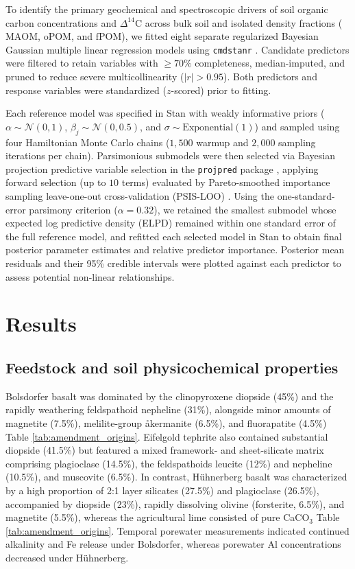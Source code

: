 \documentclass[preprint,12pt]{elsarticle}
\begin{document}
To identify the primary geochemical and spectroscopic drivers of soil organic carbon concentrations and $\Delta^{14}\text{C}$ across bulk soil and isolated density fractions ($\text{MAOM}$, $\text{oPOM}$, and $\text{fPOM}$), we fitted eight separate regularized Bayesian Gaussian multiple linear regression models using \texttt{cmdstanr} \citep{Carpenter2017, Gabry2025}. Candidate predictors were filtered to retain variables with $\ge 70\%$ completeness, median-imputed, and pruned to reduce severe multicollinearity ($|r| > 0.95$). Both predictors and response variables were standardized ($z$-scored) prior to fitting.

Each reference model was specified in Stan with weakly informative priors ($\alpha \sim \mathcal{N}(0, 1)$, $\beta_j \sim \mathcal{N}(0, 0.5)$, and $\sigma \sim \text{Exponential}(1)$) and sampled using four Hamiltonian Monte Carlo chains ($1{,}500$ warmup and $2{,}000$ sampling iterations per chain). Parsimonious submodels were then selected via Bayesian projection predictive variable selection in the \texttt{projpred} package \citep{Piironen2020, Catalina2022}, applying forward selection (up to $10$ terms) evaluated by Pareto-smoothed importance sampling leave-one-out cross-validation (PSIS-LOO) \citep{Vehtari2017}. Using the one-standard-error parsimony criterion ($\alpha = 0.32$), we retained the smallest submodel whose expected log predictive density (ELPD) remained within one standard error of the full reference model, and refitted each selected model in Stan to obtain final posterior parameter estimates and relative predictor importance. Posterior mean residuals and their 95\% credible intervals were plotted against each predictor to assess potential non-linear relationships.

\section{Results}
\label{sec:results}

\subsection{Feedstock and soil physicochemical properties}
\label{subsec:geochemistry}
Bolsdorfer basalt was dominated by the clinopyroxene diopside (45\%) and the rapidly weathering feldspathoid nepheline (31\%), alongside minor amounts of magnetite (7.5\%), melilite-group \aa kermanite (6.5\%), and fluorapatite (4.5\%) Table \ref{tab:amendment_origins}. Eifelgold tephrite also contained substantial diopside (41.5\%) but featured a mixed framework- and sheet-silicate matrix comprising plagioclase (14.5\%), the feldspathoids leucite (12\%) and nepheline (10.5\%), and muscovite (6.5\%). In contrast, H\"uhnerberg basalt was characterized by a high proportion of 2:1 layer silicates (27.5\%) and plagioclase (26.5\%), accompanied by diopside (23\%), rapidly dissolving olivine (forsterite, 6.5\%), and magnetite (5.5\%), whereas the agricultural lime consisted of pure CaCO$_3$ Table \ref{tab:amendment_origins}. 
Temporal porewater measurements indicated continued alkalinity and Fe release under Bolsdorfer, whereas porewater Al concentrations decreased under H\"uhnerberg.
\end{document}
